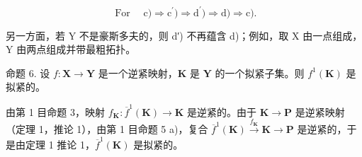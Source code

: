 \[
\text { For } \quad \mathrm{c}) \Longrightarrow \mathrm{c} ^ {\prime}) \Longrightarrow \mathrm{d} ^ {\prime}) \Longrightarrow \mathrm{d}) \Longrightarrow \mathrm{c}).
\]

另一方面，若 Y 不是豪斯多夫的，则 d′) 不再蕴含 d)；例如，取 X 由一点组成，Y 由两点组成并带最粗拓扑。

命题 6. 设 \(f: \mathbf{X} \to \mathbf{Y}\) 是一个逆紧映射，\(\mathbf{K}\) 是 \(\mathbf{Y}\) 的一个拟紧子集。则 \(f^1(\mathbf{K})\) 是拟紧的。

由第 1 目命题 3，映射 \(f_{\mathbf{K}}: \overline{f}^{1}(\mathbf{K}) \to \mathbf{K}\) 是逆紧的。由于 \(\mathbf{K} \to \mathbf{P}\) 是逆紧映射（定理 1，推论 1），由第 1 目命题 5 a)，复合 \(\overline{f}^{1}(\mathbf{K}) \xrightarrow{f_{\mathbf{K}}} \mathbf{K} \to \mathbf{P}\) 是逆紧的，于是由定理 1 推论 1，\(\overline{f}^{1}(\mathbf{K})\) 是拟紧的。

